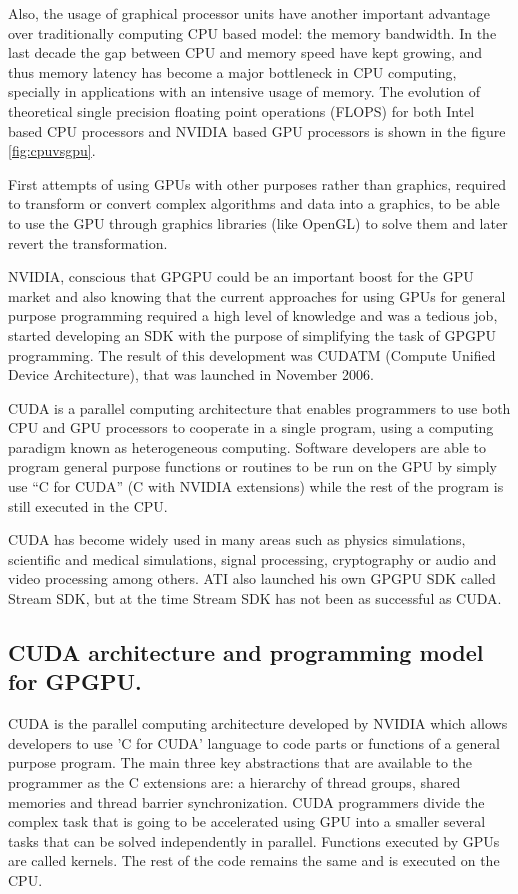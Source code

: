 \documentclass[thesis=M,english]{FITthesis}[2011/07/15]
\begin{document}
Also, the usage of graphical processor units have another important advantage over traditionally computing CPU based model: the memory bandwidth. In the last decade the gap between CPU and memory speed have kept growing, and thus memory latency has become a major bottleneck in CPU computing, specially in applications with an intensive usage of memory. The evolution of theoretical single precision floating point operations (FLOPS) for both Intel based CPU processors and NVIDIA based GPU processors is shown in the figure \ref{fig:cpuvsgpu}. 

First attempts of using GPUs with other purposes rather than graphics, required to transform or convert complex algorithms and data into a graphics, to be able to use the GPU through graphics libraries (like OpenGL) to solve them and later revert the transformation. 

NVIDIA, conscious that GPGPU could be an important boost for the GPU market and also knowing that the current approaches for using GPUs for general purpose programming required a high level of knowledge and was a tedious job, started developing an SDK with the purpose of simplifying the task of GPGPU programming. The result of this development was CUDATM (Compute Unified Device Architecture), that was launched in November 2006. 

CUDA is a parallel computing architecture that enables programmers to use both CPU and GPU processors to cooperate in a single program, using a computing paradigm known as heterogeneous computing. Software developers are able to program general purpose functions or routines to be run on the GPU by simply use “C for CUDA” (C with NVIDIA extensions) while the rest of the program is still executed in the CPU. 

CUDA has become widely used in many areas such as physics simulations, scientific and medical simulations, signal processing, cryptography or audio and video processing among others. ATI also launched his own GPGPU SDK called Stream SDK, but at the time Stream SDK has not been as successful as CUDA.

\subsection{CUDA architecture and programming model for GPGPU.}

CUDA is the parallel computing architecture developed by NVIDIA which allows developers to use 'C for CUDA' language to code parts or functions of a general purpose program. The main three key abstractions that are available to the programmer as the C extensions are: a hierarchy of thread groups, shared memories and thread barrier synchronization. CUDA programmers divide the complex task that is going to be accelerated using GPU into a smaller several tasks that can be solved independently in parallel. Functions executed by GPUs are called kernels. The rest of the code remains the same and is executed on the CPU.
\end{document}
